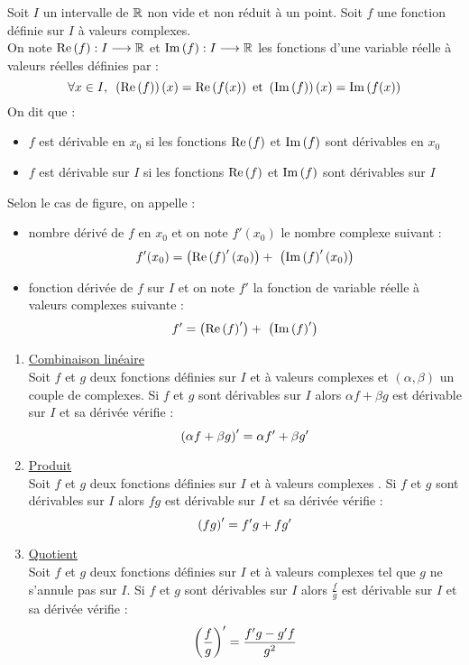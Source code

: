 \begin{defprop}[Dérivation]
	Soit \(I\) un intervalle de \(\mathbb{R}\) non vide et non réduit à un point.
	Soit \(f\) une fonction définie sur \(I\) à valeurs complexes. \\
	On note \(\operatorname{Re}\left(f\right) :I \longrightarrow \mathbb{R}\) et \(\operatorname{Im}\left(f\right):I\longrightarrow\mathbb{R}\) les fonctions d’une variable réelle à valeurs réelles définies par :
	\[\quantifs{\forall x \in I}\paren{\Reel{f}}(x) = \Reel{f(x)} \text{ et } \paren{\Ima{f}}(x) = \Ima{f(x)} \]
	On dit que : \begin{itemize}
		\item \(f\) est dérivable en \(x_0\) si les fonctions \(\operatorname{Re}\left(f\right)\) et \( \operatorname{Im}\left(f\right) \) sont dérivables en \(x_0\)
		\item \(f\) est dérivable sur \(I\) si les fonctions \(\operatorname{Re}\left(f\right)\) et \( \operatorname{Im}\left(f\right) \) sont dérivables sur \(I\)
	\end{itemize}
	Selon le cas de figure, on appelle :
	\begin{itemize}
		\item nombre dérivé de \(f\) en \(x_0\) et on note \(f'(x_0)\) le nombre complexe suivant : \[f'(x_0) = \left(\operatorname{Re}\left(f\right)'(x_0)\right) + \ \left(\operatorname{Im}\left(f\right)'(x_0)\right)\]
		\item fonction dérivée de \(f\) sur \(I\) et on note \(f'\) la fonction de variable réelle à valeurs complexes suivante :
		      \[ f' = \paren{\Reel{f}'} + \ \paren{\Ima{f}'}\]
	\end{itemize}
\end{defprop}

\begin{prop}
	\begin{enumerate}
		\item \underline{Combinaison linéaire}\\
		      Soit \(f\) et \(g\) deux fonctions définies sur \(I\) et à valeurs complexes et \((\alpha, \beta)\) un couple de complexes. Si \(f\) et \(g\) sont dérivables sur \(I\) alors \(\alpha f + \beta g \) est dérivable sur \(I\) et sa dérivée vérifie :
		      \[\left(\alpha f + \beta g\right)' = \alpha f'+\beta g'\]
		\item \underline{Produit}\\
		      Soit \(f\) et \(g\) deux fonctions définies sur \(I\) et à valeurs complexes . Si \(f\) et \(g\) sont dérivables sur \(I\) alors \(fg\) est dérivable sur \(I\) et sa dérivée vérifie :
		      \[\left(fg\right)' = f'g+fg'\]

		\item \underline{Quotient}\\
		      Soit \(f\) et \(g\) deux fonctions définies sur \(I\) et à valeurs complexes tel que \(g\) ne s’annule pas sur \(I\). Si \(f\) et \(g\) sont dérivables sur \(I\) alors \(\frac{f}{g}\) est dérivable sur \(I\) et sa dérivée vérifie :
		      \[\left(\frac{f}{g}\right)' = \frac{f'g-g'f}{g^2}\]
	\end{enumerate}
\end{prop}

